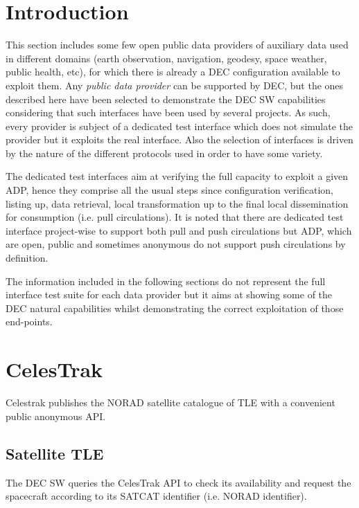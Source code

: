 \documentclass[dec_sum_main.tex]{subfiles}
\begin{document}
\label{Public Data Providers}

\section{Introduction}
 
This section includes some few open public data providers of auxiliary data used in different domains (earth observation, navigation, geodesy, space weather, public health, etc), for which there is already a DEC configuration available to exploit them. Any \textit{public data provider} can be supported by DEC, but the ones described here have been selected to demonstrate the DEC SW capabilities considering that such interfaces have been used by several projects. As such, every provider is subject of a dedicated test interface which does not simulate the provider but it exploits the real interface. Also the selection of interfaces is driven by the nature of the different protocols used in order to have some variety.\newline

\par
\noindent
The dedicated test interfaces aim at verifying the full capacity to exploit a given ADP, hence they comprise all the usual steps since configuration verification, listing up, data retrieval, local transformation up to the final local dissemination for consumption (i.e. pull circulations). It is noted that there are dedicated test interface project-wise to support both pull and push circulations but ADP, which are open, public and sometimes anonymous do not support push circulations by definition.\newline

\par
\noindent
The information included in the following sections do not represent the full interface test suite for each data provider but it aims at showing some of the DEC natural capabilities whilst demonstrating the correct exploitation of those end-points.

\pagebreak

\section{CelesTrak }
Celestrak publishes the NORAD satellite catalogue of TLE with a convenient public anonymous API.\newline  

\subsection{Satellite TLE }
The DEC SW queries the CelesTrak API to check its availability and request the spacecraft according to its SATCAT identifier (i.e. NORAD identifier).
\end{document}
